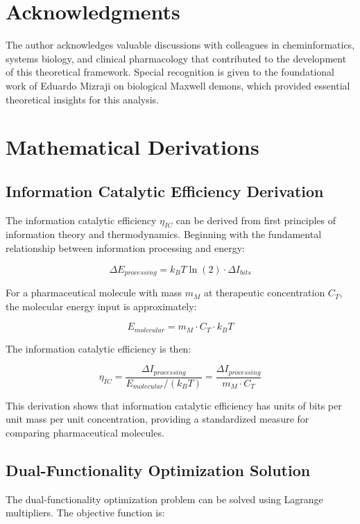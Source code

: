 \documentclass[12pt,a4paper]{article}
\begin{document}
\section*{Acknowledgments}

The author acknowledges valuable discussions with colleagues in cheminformatics, systems biology, and clinical pharmacology that contributed to the development of this theoretical framework. Special recognition is given to the foundational work of Eduardo Mizraji on biological Maxwell demons, which provided essential theoretical insights for this analysis.



\appendix

\section{Mathematical Derivations}

\subsection{Information Catalytic Efficiency Derivation}

The information catalytic efficiency $\eta_{IC}$ can be derived from first principles of information theory and thermodynamics. Beginning with the fundamental relationship between information processing and energy:

$$\Delta E_{processing} = k_B T \ln(2) \cdot \Delta I_{bits}$$

For a pharmaceutical molecule with mass $m_M$ at therapeutic concentration $C_T$, the molecular energy input is approximately:

$$E_{molecular} = m_M \cdot C_T \cdot k_B T$$

The information catalytic efficiency is then:

$$\eta_{IC} = \frac{\Delta I_{processing}}{E_{molecular} / (k_B T)} = \frac{\Delta I_{processing}}{m_M \cdot C_T}$$

This derivation shows that information catalytic efficiency has units of bits per unit mass per unit concentration, providing a standardized measure for comparing pharmaceutical molecules.

\subsection{Dual-Functionality Optimization Solution}

The dual-functionality optimization problem can be solved using Lagrange multipliers. The objective function is:
\end{document}
